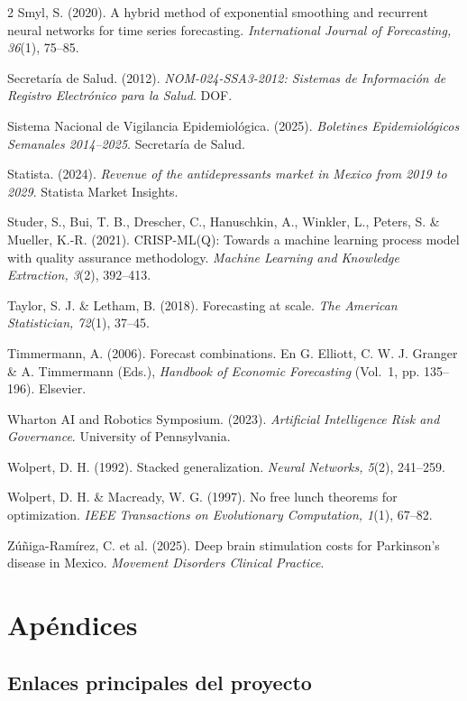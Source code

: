 \documentclass[12pt, letterpaper]{article}
\begin{document}
\begin{multicols}{2}
Smyl, S. (2020). A hybrid method of exponential smoothing and recurrent neural networks for time series forecasting. \textit{International Journal of Forecasting, 36}(1), 75--85.

Secretaría de Salud. (2012). \textit{NOM-024-SSA3-2012: Sistemas de Información de Registro Electrónico para la Salud}. DOF.

Sistema Nacional de Vigilancia Epidemiológica. (2025). \textit{Boletines Epidemiológicos Semanales 2014--2025}. Secretaría de Salud.

Statista. (2024). \textit{Revenue of the antidepressants market in Mexico from 2019 to 2029}. Statista Market Insights.

Studer, S., Bui, T. B., Drescher, C., Hanuschkin, A., Winkler, L., Peters, S. \& Mueller, K.-R. (2021). CRISP-ML(Q): Towards a machine learning process model with quality assurance methodology. \textit{Machine Learning and Knowledge Extraction, 3}(2), 392--413.

Taylor, S. J. \& Letham, B. (2018). Forecasting at scale. \textit{The American Statistician, 72}(1), 37--45.

Timmermann, A. (2006). Forecast combinations. En G. Elliott, C. W. J. Granger \& A. Timmermann (Eds.), \textit{Handbook of Economic Forecasting} (Vol.~1, pp. 135--196). Elsevier.

Wharton AI and Robotics Symposium. (2023). \textit{Artificial Intelligence Risk and Governance}. University of Pennsylvania.

Wolpert, D. H. (1992). Stacked generalization. \textit{Neural Networks, 5}(2), 241--259.

Wolpert, D. H. \& Macready, W. G. (1997). No free lunch theorems for optimization. \textit{IEEE Transactions on Evolutionary Computation, 1}(1), 67--82.

Zúñiga-Ramírez, C. et al. (2025). Deep brain stimulation costs for Parkinson's disease in Mexico. \textit{Movement Disorders Clinical Practice}.

\end{multicols}

\newpage
\section{Apéndices}\label{sec:apendices}

\subsection{Enlaces principales del proyecto}\label{sec:enlaces}
\end{document}
